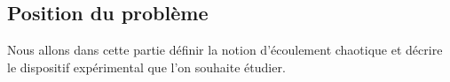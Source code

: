 \documentclass[a4paper,12pt,titlepage]{report}
\begin{document}
\begin{onehalfspace}

\chapter{Position du problème}

Nous allons dans cette partie définir la notion d'écoulement chaotique et décrire le dispositif expérimental que l'on souhaite étudier.


\end{onehalfspace}
\end{document}
